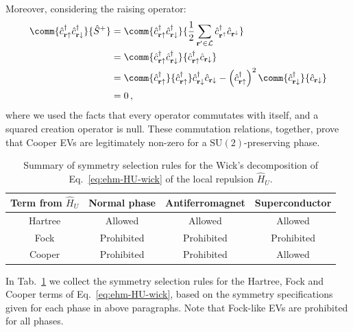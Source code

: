 \begin{tabproof}
	Moreover, considering the raising operator:
	\[
	\begin{aligned}
		\comm{\hat c_{\mathbf{r}\uparrow}^\dagger \hat c_{\mathbf{r}\downarrow}^\dagger}{\hat S^+} &= \comm{\hat c_{\mathbf{r}\uparrow}^\dagger \hat c_{\mathbf{r}\downarrow}^\dagger}{\frac{1}{2} \sum_{\mathbf{r}'\in\mathcal{L}} \hat c_{\mathbf{r}^\uparrow}^\dagger \hat c_{\mathbf{r}^\downarrow}} \\
		&= \comm{\hat c_{\mathbf{r}\uparrow}^\dagger \hat c_{\mathbf{r}\downarrow}^\dagger}{\hat c_{\mathbf{r}\uparrow}^\dagger \hat c_{\mathbf{r}\downarrow}} \\
		&= \comm{\hat c_{\mathbf{r}\uparrow}^\dagger}{\hat c_{\mathbf{r}\uparrow}^\dagger} \hat c_{\mathbf{r}\downarrow}^\dagger \hat c_{\mathbf{r}\downarrow} - \left( \hat c_{\mathbf{r}\uparrow}^\dagger \right)^2 \comm{\hat c_{\mathbf{r}\downarrow}^\dagger}{\hat c_{\mathbf{r}\downarrow}} \\
		&= 0 \, ,
	\end{aligned}
	\]
	where we used the facts that every operator commutates with itself, and a squared creation operator is null. These commutation relations, together, prove that Cooper EVs are legitimately non-zero for a $\mathrm{SU}(2)$-preserving phase.

\end{tabproof}

\begin{table}
	\centering
	\begin{tabular}{c c c c}\textbf{Term from $\hat H_U$} & \textbf{Normal phase} & \textbf{Antiferromagnet} & \textbf{Superconductor} \\
		\midrule
		Hartree & Allowed & Allowed & Allowed \\
		Fock & Prohibited & Prohibited & Prohibited \\
		Cooper & Prohibited & Prohibited & Allowed \\
		\midrule
	\end{tabular}
	\caption{Summary of symmetry selection rules for the Wick's decomposition of Eq.~\eqref{eq:ehm-HU-wick} of the local repulsion $\hat H_U$.}
	\label{tab:HU-sel-rules}
\end{table}

In Tab.~\ref{tab:HU-sel-rules} we collect the symmetry selection rules for the Hartree, Fock and Cooper terms of Eq.~\eqref{eq:ehm-HU-wick}, based on the symmetry specifications given for each phase in above paragraphs. Note that Fock-like EVs are prohibited for all phases.

